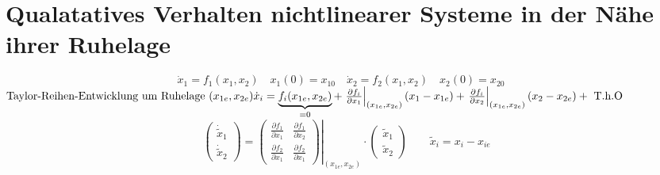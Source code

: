 \documentclass[ngerman]{tudscrreprt}
\begin{document}
\section{Qualatatives Verhalten nichtlinearer Systeme in der Nähe ihrer Ruhelage}
\begin{equation}
\dot x_1 = f_1(x_1,x_2)\quad x_1(0) = x_{10} \quad \dot x_2 = f_2(x_1,x_2)\quad x_2(0)=x_{20} \quad
\tag{2.6}
\label{eq:2.6}
\end{equation}
$\text{Taylor-Reihen-Entwicklung um Ruhelage }(x_{1e}, x_{2e})\\
\dot x_i = \underbrace{f_i (x_{1e}, x_{2e}) }_{=0}+ \left. \frac{\partial f_i}{\partial x_1}\right|_{(x_{1e}, x_{2e})}(x_1 - x_{1e}) + \left. \frac{\partial f_i}{\partial x_2}\right|_{(x_{1e}, x_{2e})}(x_2 - x_{2e}) + \text{ T.h.O}\\
$
\begin{equation}
\begin{pmatrix}
\dot{\tilde{x}}_1\\
\dot{\tilde{x}}_2
\end{pmatrix}=\left.
\begin{pmatrix}
\frac{\partial f_1}{\partial x_1}& \frac{\partial f_1}{\partial x_2} \\
\frac{\partial f_2}{\partial x_1}& \frac{\partial f_2}{\partial x_1}
\end{pmatrix}\right|_{(x_{1e}, x_{2e})} \cdot
\begin{pmatrix}
\tilde{x}_1\\
\tilde{x}_2
\end{pmatrix} \qquad \tilde x_i = x_i - x_{ie}
\tag{2.7}
\end{equation}
\end{document}
